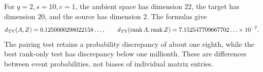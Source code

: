 \begin{example}\label{ex:binary}
For $q=2,s=10,c=1$, the ambient space has dimension $22$, the target
has dimension $20$, and the source has dimension $2$. The formulas give
\[
 d_{\mathrm{TV}}(A,Z)=0.1250000298022158\ldots,\qquad
 d_{\mathrm{TV}}(\operatorname{rank} A,\operatorname{rank} Z)=7.152547709667702\ldots\times10^{-7}.
\]
The pairing test retains a probability discrepancy of about one eighth,
while the best rank-only test has discrepancy below one millionth.
These are differences between event probabilities, not biases of
individual matrix entries.
\end{example}
